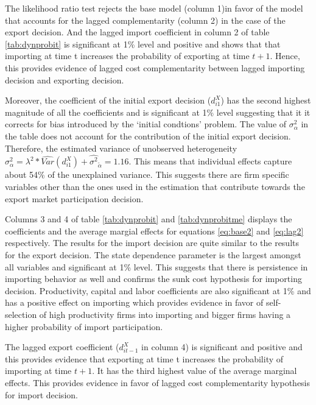 \documentclass[12pt]{article}
\begin{document}
The likelihood ratio test  rejects the base model (column 1)in favor of the
model that accounts for the lagged complementarity (column 2) in the case of 
the export decision. And the lagged import coefficient in column 2 of table \ref{tab:dynprobit} is
  significant  at 1\% level and positive and shows that   that importing
  at time t increases the probability of exporting at time $t+1$.
  Hence, this provides evidence of  lagged cost complementarity
  between lagged importing decision  and exporting decision. 


Moreover, the coefficient
 of the initial export decision ($d_{i1}^{X}$) has the second highest
     magnitude  of all the coefficients and  is significant at 1\% level
suggesting that it it corrects for bias introduced by the `initial
condtions' problem. 
 The value of
  $\sigma^2_{\alpha}$ in the table does not account for the
  contribution of the initial export decision. Therefore, the estimated
  variance of 
  unobserved heterogeneity $\sigma^2_{\alpha}= \lambda^2 *
  \hat{Var}(d_{i1}^{X})+\hat{\sigma^2}_{\tilde{\alpha}}= 1.16$. This
  means that individual effects capture about 54\% of the unexplained
  variance. This suggests there are firm specific variables other than the ones used
  in the estimation that contribute towards the export market
  participation decision. 


 Columns 3 and 4 of table \ref{tab:dynprobit} and
  \ref{tab:dynprobitme} displays the coefficients and the average
  margial effects for equations \ref{eq:base2} and \ref{eq:lag2}
  respectively. The results for the import decision are quite similar to the
 results for the export decision. The state dependence parameter is the largest
  amongst all variables and
  significant at 1\% level. This suggests that there is  persistence in
  importing behavior as well and confirms the sunk cost hypothesis for
  importing decision. 
Productivity, capital and labor coefficients are also significant at 1\%
  and has a 
  positive effect on importing which provides evidence in favor of
  self-selection of high productivity firms into importing and 
  bigger firms having a higher probability of import participation.  

The lagged export coefficient ($d_{it-1}^{X}$ in column 4) is
  significant and positive and this provides evidence that exporting
  at time t increases the probability of importing at time $t+1$. It
  has the third highest value of the average marginal effects.  This
 provides  evidence in favor of 
  lagged cost complementarity hypothesis for
  import decision.  
\end{document}

